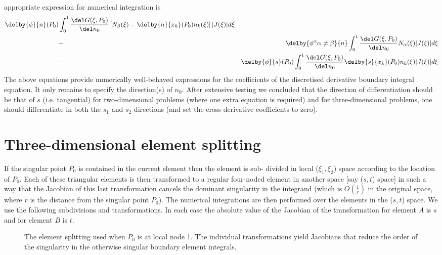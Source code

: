 appropriate expression for numerical integration is
\begin{eqnarray}
 \delby{\phi}{n}(P_{0}) &\int_{0}^{1}\frac{\del G(\xi,P_{0})}
  {\del n_{0}}\left[ N_{\beta}(\xi)-\delby{n}{x_{k}}(P_{0})n_{k}(\xi)\right]
  |J(\xi)|d\xi \nonumber\\
 &-&\delby{\phi^\alpha{\alpha\neq\beta}}{n}\int_{0}^{1}
  \frac{\del G(\xi,P_{0})}{\del n_{0}}N_{\alpha}(\xi)|J(\xi)|d\xi\nonumber\\
 &-&\delby{\phi}{s}(P_{0})\int_{0}^{1}\frac{\del G(\xi,P_{0})}
  {\del n_{0}}\delby{s}{x_{k}}(P_{0})n_{k}(\xi)|J(\xi)|d\xi
 \label{eq:approp}
\end{eqnarray}
The above equations provide numerically well-behaved expressions for the
coefficients of the discretised derivative boundary integral equation.  It
only remains to specify the direction(s) of $n_{0}$.  After extensive testing
\cite{tomlinson:1996} we concluded that the direction of differentiation
should be that of $s$ (i.e.  tangential) for two-dimensional problems (where
one extra equation is required) and for three-dimensional problems, one should
differentiate in both the $s_{1}$ and $s_{2}$ directions (and set the cross
derivative coefficients to zero).

\section{Three-dimensional element splitting}

If the singular point $P_{0}$ is contained in the current element then the
element is sub- divided in local ($\xi_{1}, \xi_{2}$) space according to the
location of $P_{0}$.  Each of these triangular elements is then transformed to
a regular four-noded element in another space [say ($s, t$) space] in such a
way that the Jacobian of this last transformation cancels the dominant
singularity in the integrand (which is $O( \frac{1}{r} )$ in the original
space, where $r$ is the distance from the singular point $P_{0}$).  The
numerical integrations are then performed over the elements in the ($s,t$)
space.  We use the following subdivisions and transformations.  In each case
the absolute value of the Jacobian of the transformation for element $A$ is
$s$ and for element $B$ is $t$.

\begin{figure}
\centering
 
 \caption[The element splitting used when $P_{0}$ is at local node 1]{The element splitting used when $P_{0}$ is at local node 1.  The individual transformations 
   yield Jacobians that reduce the order of the singularity in the otherwise
   singular boundary element integrals.}
\label{fig:A1}
\end{figure}

